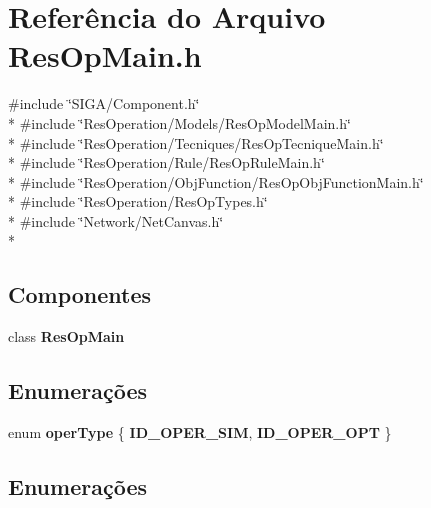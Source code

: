 \section{Referência do Arquivo Res\+Op\+Main.\+h}
\label{_res_op_main_8h}
{\ttfamily \#include \char`\"{}S\+I\+G\+A/\+Component.\+h\char`\"{}}\\*
{\ttfamily \#include \char`\"{}Res\+Operation/\+Models/\+Res\+Op\+Model\+Main.\+h\char`\"{}}\\*
{\ttfamily \#include \char`\"{}Res\+Operation/\+Tecniques/\+Res\+Op\+Tecnique\+Main.\+h\char`\"{}}\\*
{\ttfamily \#include \char`\"{}Res\+Operation/\+Rule/\+Res\+Op\+Rule\+Main.\+h\char`\"{}}\\*
{\ttfamily \#include \char`\"{}Res\+Operation/\+Obj\+Function/\+Res\+Op\+Obj\+Function\+Main.\+h\char`\"{}}\\*
{\ttfamily \#include \char`\"{}Res\+Operation/\+Res\+Op\+Types.\+h\char`\"{}}\\*
{\ttfamily \#include \char`\"{}Network/\+Net\+Canvas.\+h\char`\"{}}\\*
\subsection*{Componentes}
\begin{DoxyCompactItemize}
\item 
class {\bf Res\+Op\+Main}
\end{DoxyCompactItemize}
\subsection*{Enumerações}
\begin{DoxyCompactItemize}
\item 
enum {\bf oper\+Type} \{ {\bf I\+D\+\_\+\+O\+P\+E\+R\+\_\+\+S\+IM}, 
{\bf I\+D\+\_\+\+O\+P\+E\+R\+\_\+\+O\+PT}
 \}
\end{DoxyCompactItemize}


\subsection{Enumerações}
